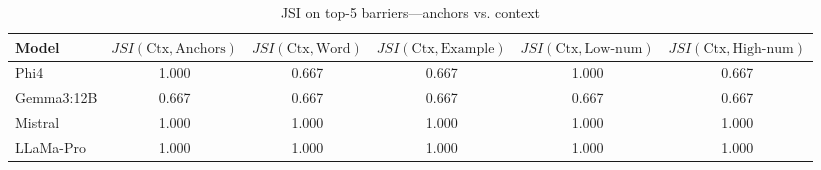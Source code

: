 \begin{table}[ht]
\caption{JSI on top-5 barriers---anchors vs. context}
\label{tab:rq3_jaccard_top5}
\begin{tabular}{lccccc}
\toprule
Model & $JSI(\mathrm{Ctx},\mathrm{Anchors})$ & $JSI(\mathrm{Ctx},\mathrm{Word})$ & $JSI(\mathrm{Ctx},\mathrm{Example})$ & $JSI(\mathrm{Ctx},\mathrm{Low\text{-}num})$ & $JSI(\mathrm{Ctx},\mathrm{High\text{-}num})$ \\
\midrule
Phi4 & 1.000 & 0.667 & 0.667 & 1.000 & 0.667 \\
Gemma3:12B & 0.667 & 0.667 & 0.667 & 0.667 & 0.667 \\
Mistral & 1.000 & 1.000 & 1.000 & 1.000 & 1.000 \\
LLaMa-Pro & 1.000 & 1.000 & 1.000 & 1.000 & 1.000 \\
\bottomrule
\end{tabular}
\end{table}

